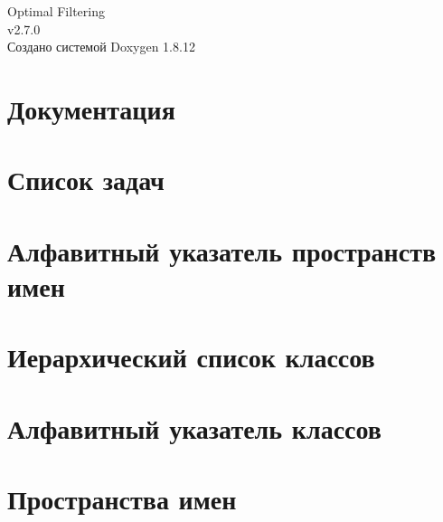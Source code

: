 \documentclass[twoside]{book}
\newcommand{\+}{\discretionary{\mbox{\scriptsize$\hookleftarrow$}}{}{}}
\newcommand{\clearemptydoublepage}{%
  \newpage{\pagestyle{empty}\cleardoublepage}%
}
\begin{document}
\hypersetup{pageanchor=false,
             bookmarksnumbered=true,
             pdfencoding=unicode
            }
\begin{titlepage}
\vspace*{7cm}
\begin{center}%
{\Large Optimal Filtering \\[1ex]\large v2.\+7.\+0 }\\
\vspace*{1cm}
{\large Создано системой Doxygen 1.8.12}\\
\end{center}
\end{titlepage}
\clearemptydoublepage
{}
\tableofcontents
\clearemptydoublepage
{}
\hypersetup{pageanchor=true}

\chapter{Документация}
\label{index}\hypertarget{index}{}
\chapter{Список задач}
\label{todo}
\hypertarget{todo}{}

\chapter{Алфавитный указатель пространств имен}

\chapter{Иерархический список классов}

\chapter{Алфавитный указатель классов}

\chapter{Пространства имен}













\end{document}
